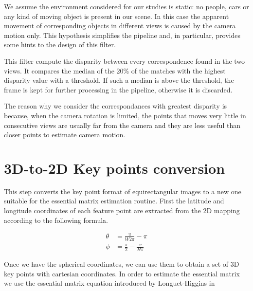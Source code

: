 We assume the environment considered for our studies is static: no people, 
cars or any kind of moving object is present in our scene. In this case the 
apparent movement of corresponding objects in different views is caused by 
the camera motion only. This hypothesis simplifies the pipeline and, 
in particular, provides some hints to the design of this filter.

This filter compute the disparity between every correspondence found in the 
two views. It compares the median of the 20\% of the matches with the highest 
disparity value with a threshold. If such a median is above 
the threshold, the frame is kept for further processing in the pipeline, 
otherwise it is discarded.

The reason why we consider the correspondances with greatest disparity is 
because, when the camera rotation is limited, the points that moves very little 
in consecutive views are usually far from the camera and they are less
useful than closer points to estimate camera motion. 

\section{3D-to-2D Key points conversion}
This step converts the key point format of equirectangular images to a new one 
suitable for the essential matrix estimation routine.
First the latitude and longitude coordinates of each feature point are 
extracted from the 2D mapping according to the following formula.

\begin{align*}
\theta &= \frac{u}{W 2 \pi} - \pi \\
\phi &= \frac{\pi}{2} - \frac{v}{H \pi}
\end{align*}

Once we have the spherical coordinates, we can use them to obtain a set of 3D 
key points with cartesian coordinates. In order to estimate the essential 
matrix we use the essential matrix equation introduced by Longuet-Higgins in 
\cite{longuet1981computer}
